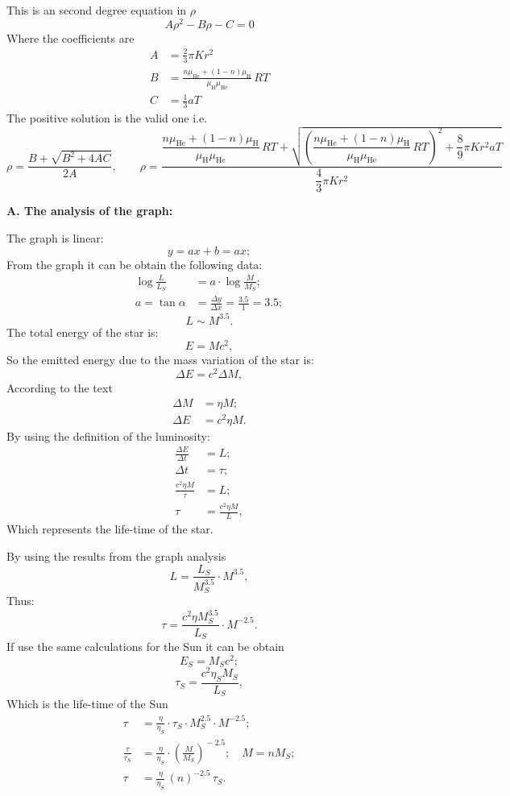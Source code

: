 This is an second degree equation in $\rho$
\[
  A\rho^2 - B\rho - C = 0
\]
Where the coefficients are
\begin{align*}
  A &= \frac{2}{3}\pi K r^2 \\
  B &= \frac{n\mu_{\mathrm{He}} + (1-n)\mu_{\mathrm{H}}}{\mu_{\mathrm{H}}\mu_{\mathrm{He}}}\,RT \\
  C &= \frac{1}{3}aT
\end{align*}
The positive solution is the valid one i.e.
\[
  \rho = \frac{B + \sqrt{B^2 + 4AC}}{2A}, \qquad
  \rho = \frac{\dfrac{n\mu_{\mathrm{He}} + (1-n)\mu_{\mathrm{H}}}{\mu_{\mathrm{H}}\mu_{\mathrm{He}}}\,RT
    + \sqrt{\left(\dfrac{n\mu_{\mathrm{He}} + (1-n)\mu_{\mathrm{H}}}{\mu_{\mathrm{H}}\mu_{\mathrm{He}}}\,RT\right)^{\!2}
    + \dfrac{8}{9}\pi K r^2 aT}}
    {\dfrac{4}{3}\pi K r^2}
\]

\textbf{A. The analysis of the graph:}

The graph is linear:
\[
  y = ax + b = ax;
\]
From the graph it can be obtain the following data:
\begin{align*}
  \log\frac{L}{L_S} &= a\cdot\log\frac{M}{M_S}; \\
  a = \tan\alpha &= \frac{\Delta y}{\Delta x} = \frac{3.5}{1} = 3.5;
\end{align*}
\[
  L \sim M^{3.5}. \tag{1}
\]
The total energy of the star is:
\[
  E = Mc^2,
\]
So the emitted energy due to the mass variation of the star is:
\[
  \Delta E = c^2 \Delta M,
\]
According to the text
\begin{align*}
  \Delta M &= \eta M; \\
  \Delta E &= c^2 \eta M.
\end{align*}
By using the definition of the luminosity:
\begin{align*}
  \frac{\Delta E}{\Delta t} &= L; \tag{2} \\
  \Delta t &= \tau; \\
  \frac{c^2\eta M}{\tau} &= L; \\
  \tau &= \frac{c^2\eta M}{L}, \tag{2}
\end{align*}
Which represents the life-time of the star.

By using the results from the graph analysis
\[
  L = \frac{L_S}{M_S^{3.5}}\cdot M^{3.5},
\]
Thus:
\[
  \tau = \frac{c^2\eta M_S^{3.5}}{L_S}\cdot M^{-2.5}.
\]
If use the same calculations for the Sun it can be obtain
\[
  E_S = M_S c^2;
\]
\[
  \tau_S = \frac{c^2\eta_S M_S}{L_S},
\]
Which is the life-time of the Sun
\begin{align*}
  \tau &= \frac{\eta}{\eta_S}\cdot\tau_S\cdot M_S^{2.5}\cdot M^{-2.5}; \\
  \frac{\tau}{\tau_S} &= \frac{\eta}{\eta_S}\cdot\left(\frac{M}{M_S}\right)^{\!-2.5};
  \quad M = nM_S; \\
  \tau &= \frac{\eta}{\eta_S}\,(n)^{-2.5}\,\tau_S.
\end{align*}

